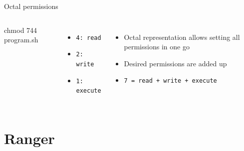     \begin{frame}[t,fragile]{Octal permissions}
        \begin{columns}[T]
            \begin{bashenv}[\small]
chmod 744 program.sh
            \end{bashenv}
            \begin{itemize}
                \item \texttt{4: read}
                \item \texttt{2: write}
                \item \texttt{1: execute}
            \end{itemize}
            \begin{itemize}
                \item Octal representation allows setting all permissions in one go
                \item Desired permissions are added up
                \item \texttt{7 = read + write + execute}
            \end{itemize}
        \end{columns}
    \end{frame}

    \section{Ranger}

